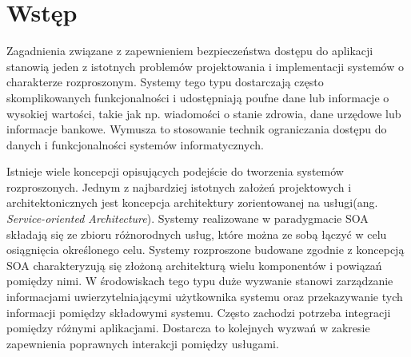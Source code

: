 \chapter{Wstęp}
\label{cha:wstep}


\label{sec:motywacje}

Zagadnienia związane z zapewnieniem bezpieczeństwa dostępu do aplikacji stanowią jeden z istotnych problemów projektowania i implementacji systemów o charakterze rozproszonym. Systemy tego typu dostarczają często skomplikowanych funkcjonalności i udostępniają poufne dane lub informacje o wysokiej wartości, takie jak np. wiadomości o stanie zdrowia, dane urzędowe lub informacje bankowe. Wymusza to stosowanie technik ograniczania dostępu do danych i funkcjonalności systemów informatycznych.

Istnieje wiele koncepcji opisujących podejście do tworzenia systemów rozproszonych. Jednym z najbardziej istotnych założeń projektowych i architektonicznych jest koncepcja architektury zorientowanej na usługi(ang. \textit{Service-oriented Architecture}). Systemy realizowane w paradygmacie SOA składają się ze zbioru różnorodnych usług, które można ze sobą łączyć w celu osiągnięcia określonego celu. Systemy rozproszone budowane zgodnie z koncepcją SOA charakteryzują się złożoną architekturą wielu komponentów i powiązań pomiędzy nimi. W środowiskach tego typu duże wyzwanie stanowi zarządzanie informacjami uwierzytelniającymi użytkownika systemu oraz przekazywanie tych informacji pomiędzy składowymi systemu. Często zachodzi potrzeba integracji pomiędzy różnymi aplikacjami. Dostarcza to kolejnych wyzwań w zakresie zapewnienia poprawnych interakcji pomiędzy usługami.

